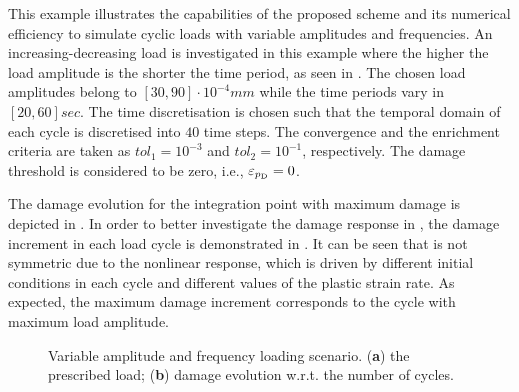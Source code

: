 
This example illustrates the capabilities of the proposed scheme and its numerical efficiency to simulate cyclic loads with variable amplitudes and frequencies. An increasing-decreasing load is investigated in this example where the higher the load amplitude is the shorter the time period, as seen in . The chosen load amplitudes belong to $[30,90]\cdot10^{-4}\unit{mm}$ while the time periods vary in $[20,60]\unit{sec}$. The time discretisation is chosen such that the temporal domain of each cycle is discretised into $40$ time steps. The convergence and the enrichment criteria are taken as $tol_1=10^{-3}$ and $tol_2=10^{-1}$, respectively. The damage threshold is considered to be zero, i.e., $\varepsilon_{p_{\rm D}} = 0$.

The damage evolution for the integration point with maximum damage is depicted in . In order to better investigate the damage response in , the damage increment in each load cycle is demonstrated in . It can be seen that  is not symmetric due to the nonlinear response, which is driven by different initial conditions in each cycle and different values of the plastic strain rate. As expected, the maximum damage increment corresponds to the cycle with maximum load amplitude.
\begin{figure}[hbt!]
	\centering
	\begin{subfigure}[]{0.49\linewidth}
		
		\caption{}
		\label{fig_var_load}
	\end{subfigure}
	\hfil
	\begin{subfigure}[]{0.49\linewidth}
		
		\caption{}
		\label{fig_var_damage}
	\end{subfigure}
	\caption{Variable amplitude and frequency loading scenario.  (\textbf{a}) the prescribed load; (\textbf{b}) damage evolution w.r.t. the number of cycles.}
	\label{fig_var_load_damage}
\end{figure}

